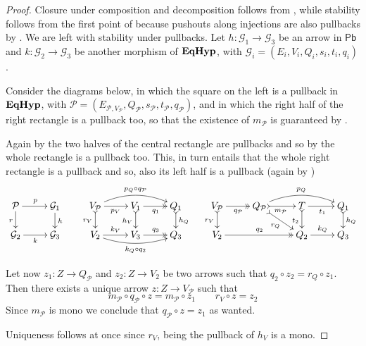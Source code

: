 \documentclass[a4paper,UKenglish,cleveref,pdftex,amsthm,thm-restate,numberwithinsect]{cas-sc}
\newcommand{\pbc}{\mathsf{Pb}}
\theoremstyle{plain}
\theoremstyle{definition}
\newcommand{\catname}[1]{\textbf{\textup{#1}}}
\newcommand{\EqHyp}{\catname{EqHyp}} %
\begin{document}
\begin{proof}\label{proof:pbmono}
	Closure under composition and decomposition follows from , while stability follows from the first point of  because pushouts along injections are also pullbacks by . We are left with stability under pullbacks. 
	Let $h\colon \mathcal{G}_1\to \mathcal{G}_3$ be an arrow in $\pbc$ and $k\colon \mathcal{G}_2\to \mathcal{G}_3$ be another morphism of $\EqHyp$, with $\mathcal{G}_{i}=(E_i, V_i, Q_i, s_i, t_i, q_i)$.
	
	Consider the diagrams below, in which the square on the left is a pullback in $\EqHyp$, with $\mathcal{P}=(E_{\mathcal{P}, V_{\mathcal{P}}}, Q_{\mathcal{P}}, s_{\mathcal{P}}, t_{\mathcal{P}}, q_{\mathcal{P}})$, and in which the right half of the right rectangle is a pullback too, so that the existence of $m_\mathcal{P}$ is guaranteed by . 
	
	Again by  the two halves of the central rectangle are pullbacks and so by  the whole rectangle is a pullback too. This, in turn entails that the whole right rectangle is a pullback and so, also its left half is a pullback (again by )
	\[
	\xymatrix@R=15pt{\mathcal{P} \ar[r]^{p} \ar[d]_{r}&  \mathcal{G}_1 \ar[d]^{h} &
		V_{\mathcal{P}} \ar@/^.4cm/[rr]^{p_Q\circ q_{\mathcal{P}}} \ar[r]_{p_V} \ar@{>->}[d]_{r_V}& V_1  \ar@{>>}[r]_{q_1} \ar@{>->}[d]_{h_V}& Q_1 \ar@{>->}[d]^{h_Q}& V_{\mathcal{P}} \ar@{>>}[r]_{q_{\mathcal{P}}} \ar@{>->}[d]_{r_V} & Q_{\mathcal{P}} \ar@{>->}[dr]_{r_Q} \ar@/^.4cm/[rr]^{p_Q} \ar@{>->}[r]_{m_{\mathcal{P}}}& T \ar[r]_{t_1} \ar@{>->}[d]_{t_2} & Q_1 \ar@{>->}[d]^{h_Q}\\
		\mathcal{G}_2 \ar[r]_{k} & \mathcal{G}_3 &   V_2  \ar@/_.3cm/[rr]_{k_Q\circ q_2}\ar[r]^{k_V}& V_3 \ar@{>>}[r]^{q_3} & Q_3 &V_2 \ar@{>>}[rr]^{q_2}&& Q_2 \ar[r]^{k_Q} & Q_3 }
	\]
	
	
	
	Let now $z_1\colon Z\to Q_{\mathcal{P}}$ and $z_2\colon Z\to V_2$ be two arrows such that $q_2\circ z_2=r_Q\circ z_1$. Then there exists a unique arrow $z\colon Z\to V_{\mathcal{P}}$ such that
	\[m_{\mathcal{P}}\circ q_{\mathcal{P}}\circ z= m_{\mathcal{P}}\circ z_1 \qquad r_V\circ z=z_2\]
	Since $m_\mathcal{P}$ is mono we conclude that $q_{\mathcal{P}}\circ z=z_1$ as wanted.
	
	Uniqueness follows at once since $r_V$, being the pullback of $h_V$ is a mono.
\end{proof}
\end{document}
